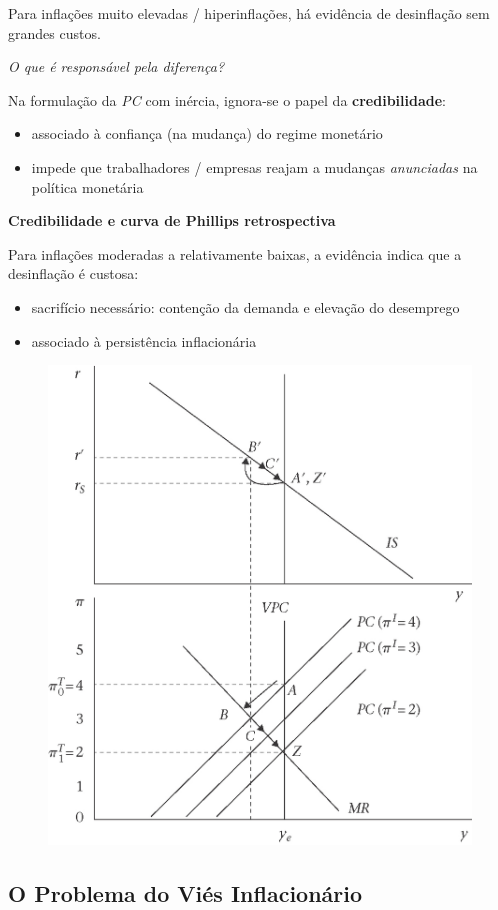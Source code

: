 \documentclass[a4paper,12pt]{article}[abntex2]
\begin{document}
Para inflações muito elevadas / hiperinflações, há evidência de desinflação sem grandes custos.

\textit{O que é responsável pela diferença?}

Na formulação da \textit{PC} com inércia, ignora-se o papel da \textbf{credibilidade}: \begin{itemize}
    \item associado à confiança (na mudança) do regime monetário
    \item impede que trabalhadores / empresas reajam a mudanças \textit{anunciadas} na política monetária
\end{itemize}

\textbf{Credibilidade e curva de Phillips retrospectiva}

Para inflações moderadas a relativamente baixas, a evidência indica que a desinflação é custosa:

\begin{itemize}
    \item sacrifício necessário: contenção da demanda e elevação do desemprego
    \item associado à persistência inflacionária
\end{itemize}

\begin{figure}[H]
    \centering
    \includegraphics[width=0.7\linewidth]{Imagens/a17i1.png}
\end{figure}

\subsection{\textbf{O Problema do Viés Inflacionário}}
\end{document}
